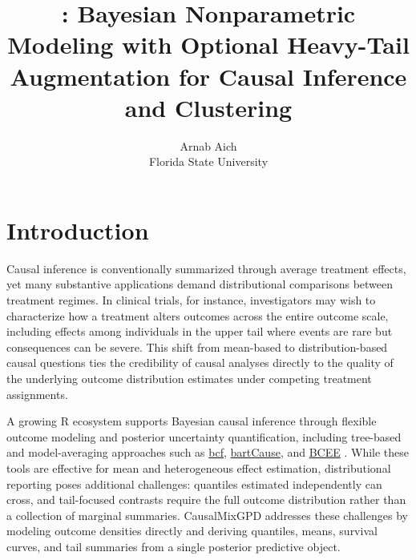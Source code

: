 \documentclass[article]{jss}\usepackage[]{graphicx}\usepackage[]{xcolor}
\author{Arnab Aich\\Florida State University}
\title{\pkg{CausalMixGPD}: Bayesian Nonparametric Modeling with Optional Heavy-Tail Augmentation for Causal Inference and Clustering}
\DeclareRobustCommand{\pkg}[1]{\textsf{#1}}
\begin{document}
\maketitle
\sloppy
\raggedbottom



\section{Introduction}
\label{sec:intro}

Causal inference is conventionally summarized through average treatment
effects, yet many substantive applications demand distributional
comparisons between treatment regimes.  In clinical trials, for
instance, investigators may wish to characterize how a treatment alters
outcomes across the entire outcome scale, including effects among
individuals in the upper tail where events are rare but consequences
can be severe.  This shift from mean-based to distribution-based causal
questions ties the credibility of causal analyses directly to the
quality of the underlying outcome distribution estimates under
competing treatment assignments.

A growing \textsf{R} ecosystem supports Bayesian causal inference
through flexible outcome modeling and posterior uncertainty
quantification, including tree-based and model-averaging approaches
such as
\href{https://cran.r-project.org/package=bcf}{\textsf{bcf}},
\href{https://cran.r-project.org/package=bartCause}{\textsf{bartCause}},
and
\href{https://cran.r-project.org/package=BCEE}{\textsf{BCEE}}
\citep{bcf_pkg,bartCause_pkg,BCEE_pkg}.  While these tools are
effective for mean and heterogeneous effect estimation, distributional
reporting poses additional challenges: quantiles estimated
independently can cross, and tail-focused contrasts require the full
outcome distribution rather than a collection of marginal summaries.
\pkg{CausalMixGPD} addresses these challenges by modeling outcome
densities directly and deriving quantiles, means, survival curves, and
tail summaries from a single posterior predictive object.
\end{document}

